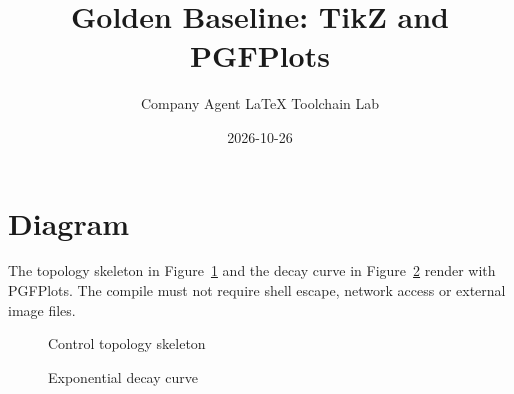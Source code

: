 \documentclass[11pt]{article}
\begin{document}
\title{Golden Baseline: TikZ and PGFPlots}
\author{Company Agent LaTeX Toolchain Lab}
\date{2026-10-26}
\maketitle

\section{Diagram}
The topology skeleton in Figure~\ref{fig:topology} and the decay curve in
Figure~\ref{fig:decay} render with PGFPlots. The compile must not require
shell escape, network access or external image files.

\begin{figure}[ht]
  \centering
  \caption{Control topology skeleton}
  \label{fig:topology}
\end{figure}

\begin{figure}[ht]
  \centering
  \caption{Exponential decay curve}
  \label{fig:decay}
\end{figure}
\end{document}

